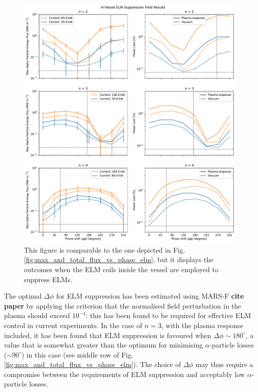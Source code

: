 \documentclass[10pt, a4paper, twoside]{article}
\begin{document}
\begin{figure}[!htb]
    \centering
    \includegraphics[width=0.99\linewidth]{Figures/max_and_total_flux_vs_phase_rwm.pdf}
    \caption{This figure is comparable to the one depicted in Fig. \ref{fig:max_and_total_flux_vs_phase_elm}, but it displays the outcomes when the ELM coils inside the vessel are employed to suppress ELMs.}
    \label{fig:max_and_total_flux_vs_phase_elm_rwm}
\end{figure}

The optimal $\Delta\phi$ for ELM suppression has been estimated using MARS-F \textbf{cite paper} by applying the criterion that the normalised field perturbation in the plasma should exceed $10^{-4}$: this has been found to be required for effective ELM control in current experiments. In the case of $n = 3$, with the plasma response included, it has been found that ELM suppression is favoured when $\Delta\phi \sim 180^{\circ}$, a value that is somewhat greater than the optimum for minimising $\alpha$-particle losses ($\sim 90^{\circ}$) in this case (see middle row of Fig. \ref{fig:max_and_total_flux_vs_phase_elm}). The choice of $\Delta\phi$ may thus require a compromise between the requirements of ELM suppression and acceptably low $\alpha$-particle losses.
\end{document}
